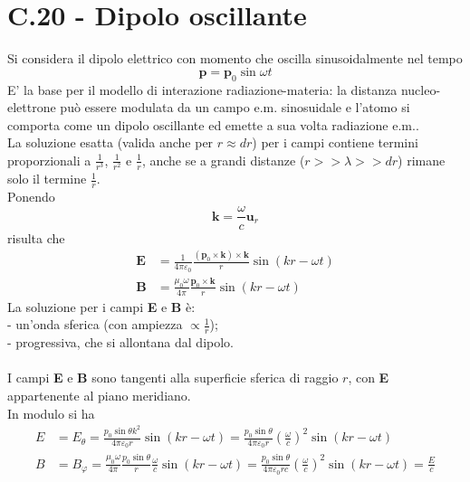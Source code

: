 \documentclass{article}
\begin{document}
\section*{C.20 - Dipolo oscillante}
Si considera il dipolo elettrico con momento che oscilla sinusoidalmente nel tempo
\begin{equation}
    \textbf{p}=\textbf{p}_0\sin\omega t
    \nonumber
\end{equation}
E’ la base per il modello di interazione radiazione-materia: la distanza nucleo-elettrone può essere modulata da un campo e.m. sinosuidale e l’atomo si comporta come un dipolo oscillante ed emette a sua volta radiazione e.m..\\
La soluzione esatta (valida anche per $r \approx dr$) per i campi contiene termini proporzionali a $\frac{1}{r^3}$, $\frac{1}{r^2}$ e $\frac{1}{r}$, anche se a grandi distanze ($r >> \lambda >> dr$) rimane solo il termine $\frac{1}{r}$.\\
Ponendo
\begin{equation}
    \textbf{k}=\frac{\omega}{c}\textbf{u}_r
    \nonumber
\end{equation}
risulta che 
\begin{equation}
\begin{split}
    \textbf{E}&=\frac{1}{4\pi \varepsilon_0}\frac{(\textbf{p}_0\times\textbf{k})\times\textbf{k}}{r}\sin(kr-\omega t)\\
    \textbf{B}&=\frac{\mu_0\omega}{4\pi} \frac{\textbf{p}_0\times\textbf{k}}{r}\sin(kr-\omega t)
    \nonumber
\end{split}
\end{equation}
La soluzione per i campi \textbf{E} e \textbf{B} è:\\
- un’onda sferica (con ampiezza $\propto\frac{1}{r}$);\\
- progressiva, che si allontana dal dipolo.\\
\\
I campi \textbf{E} e \textbf{B} sono tangenti alla superficie sferica di raggio $r$, con \textbf{E} appartenente al piano meridiano.\\
In modulo si ha
\begin{equation}
\begin{split}
    E&=E_{\theta}=\frac{p_0\sin\theta k^2}{4\pi \varepsilon_0 r}\sin(kr-\omega t)=\frac{p_0\sin\theta }{4\pi \varepsilon_0 r}\left(\frac{\omega}{c}\right)^2\sin(kr-\omega t)\\
    B&=B_{\varphi}=\frac{\mu_0\omega}{4\pi} \frac{p_0\sin\theta}{r}\frac{\omega}{c}\sin(kr-\omega t)=\frac{p_0\sin\theta}{4\pi\varepsilon_0rc} \left(\frac{\omega}{c}\right)^2\sin(kr-\omega t) =\frac{E}{c}
    \nonumber
\end{split}
\end{equation}
\end{document}
